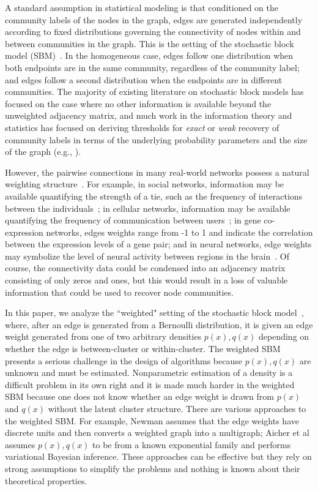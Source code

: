 \documentclass{article}
\begin{document}
A standard assumption in statistical modeling is that conditioned on the community labels of the nodes in the graph, edges are generated independently according to fixed distributions governing the connectivity of nodes within and between communities in the graph. This is the setting of the stochastic block model (SBM)~\cite{HolEtal83, HarEtal76, WasAnd87}. In the homogeneous case, edges follow one distribution when both endpoints are in the same community, regardless of the community label; and edges follow a second distribution when the endpoints are in different communities. The majority of existing literature on stochastic block models has focused on the case where no other information is available beyond the unweighted adjacency matrix, and much work in the information theory and statistics has focused on  deriving thresholds for \emph{exact} or \emph{weak} recovery of community labels in terms of the underlying probability parameters and the size of the graph (e.g., \cite{MosEtal12, MosEtal14, Mas14, AbbEtal14, abbe2014exact, AbbSan15, HajEtal14, HajEtal15, zhangminimax}).

However, the pairwise connections in many real-world networks possess a natural weighting structure~\cite{New04, BocEtal06}. For example, in social networks, information may be available quantifying the strength of a tie, such as the frequency of interactions between the individuals~\cite{Sad72}; in cellular networks, information may be available quantifying the frequency of communication between users~\cite{BloEtal08}; in gene co-expression networks, edges weights range from -1 to 1 and indicate the correlation between the expression levels of a gene pair; and in neural networks, edge weights may symbolize the level of neural activity between regions in the brain~\cite{RubSpo10}. Of course, the connectivity data could be condensed into an adjacency matrix consisting of only zeros and ones, but this would result in a loss of valuable information that could be used to recover node communities.

In this paper, we analyze the ``weighted" setting of the stochastic block model~\cite{aicher2014learning}, where, after an edge is generated from a Bernoulli distribution, it is given an edge weight generated from one of two arbitrary densities $p(x), q(x)$ depending on whether the edge is between-cluster or within-cluster. The weighted SBM presents a serious challenge in the design of algorithms because $p(x), q(x)$ are unknown and must be estimated. Nonparametric estimation of a density is a difficult problem in its own right and it is made much harder in the weighted SBM because one does not know whether an edge weight is drawn from $p(x)$ and $q(x)$ without the latent cluster structure. There are various approaches to the weighted SBM. For example, Newman \cite{New04} assumes that the edge weights have discrete units and then converts a weighted graph into a multigraph; Aicher et al \cite{aicher2014learning} assumes $p(x), q(x)$ to be from a known exponential family and performs variational Bayesian inference. These approaches can be effective but they rely on strong assumptions to simplify the problems and nothing is known about their theoretical properties. 
\end{document}
